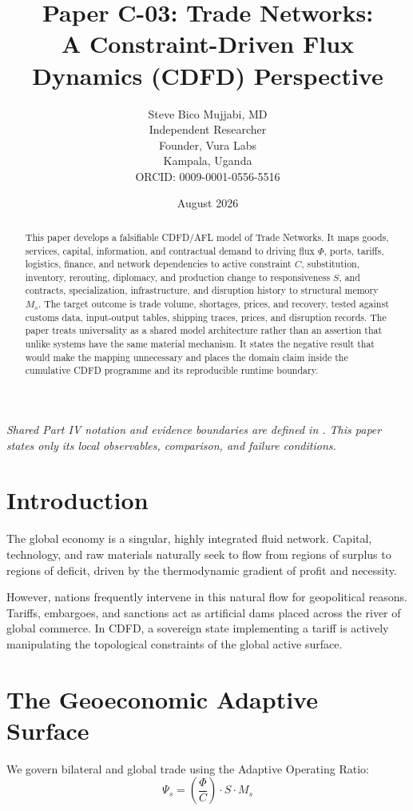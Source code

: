 \documentclass[11pt,a4paper]{article}
\title{\textbf{Paper C-03: Trade Networks:\\ A Constraint-Driven Flux Dynamics (CDFD) Perspective}}
\author{Steve Bico Mujjabi, MD\\
\small Independent Researcher\\
\small Founder, Vura Labs\\
\small Kampala, Uganda\\
\small ORCID: 0009-0001-0556-5516}
\date{August 2026}
\begin{document}
\maketitle

\noindent\textit{Shared Part IV notation and evidence boundaries are defined in . This paper states only its local observables, comparison, and failure conditions.}


\begin{abstract}
This paper develops a falsifiable CDFD/AFL model of Trade Networks. It maps goods, services, capital, information, and contractual demand to driving flux $\Phi$, ports, tariffs, logistics, finance, and network dependencies to active constraint $C$, substitution, inventory, rerouting, diplomacy, and production change to responsiveness $S$, and contracts, specialization, infrastructure, and disruption history to structural memory $M_s$. The target outcome is trade volume, shortages, prices, and recovery, tested against customs data, input-output tables, shipping traces, prices, and disruption records. The paper treats universality as a shared model architecture rather than an assertion that unlike systems have the same material mechanism. It states the negative result that would make the mapping unnecessary and places the domain claim inside the cumulative CDFD programme and its reproducible runtime boundary.
\end{abstract}

\section{Introduction}

The global economy is a singular, highly integrated fluid network. Capital, technology, and raw materials naturally seek to flow from regions of surplus to regions of deficit, driven by the thermodynamic gradient of profit and necessity.

However, nations frequently intervene in this natural flow for geopolitical reasons. Tariffs, embargoes, and sanctions act as artificial dams placed across the river of global commerce. In CDFD, a sovereign state implementing a tariff is actively manipulating the topological constraints of the global active surface.

\section{The Geoeconomic Adaptive Surface}
We govern bilateral and global trade using the Adaptive Operating Ratio:
\begin{equation}
    \Psi_s = \left( \frac{\Phi}{C} \right) \cdot S \cdot M_s
\end{equation}
\end{document}
